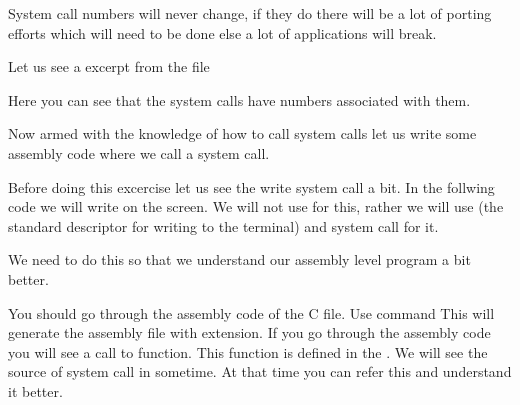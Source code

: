 \documentclass[letterpaper,10pt,english]{sphinxmanual}
\begin{document}
System call numbers will never change, if they do there will be a lot of
porting efforts which will need to be done else a lot of applications will
break.

Let us see a excerpt from the file 

\begin{sphinxVerbatim}[commandchars=\\\{\}]
\end{sphinxVerbatim}

Here you can see that the system calls have numbers associated with them.

Now armed with the knowledge of how to call system calls let us write some
assembly code where we call a system call.

Before doing this excercise let us see the write system call a bit. In the
follwing code we will write  on the screen. We will not use
 for this, rather we will use  (the standard descriptor for
writing to the terminal) and  system call for it.

We need to do this so that we understand our assembly level program a bit better.

\begin{sphinxVerbatim}[commandchars=\\\{\},numbers=left,firstnumber=1,stepnumber=1]
 

  
       
     
\end{sphinxVerbatim}

You should go through the assembly code of the C file. Use command  This will generate the assembly file with  extension. If you
go through the assembly code you will see a call to  function. This
function is defined in the . We will see the source of 
system call in sometime. At that time you can refer this and understand it
better.
\end{document}

